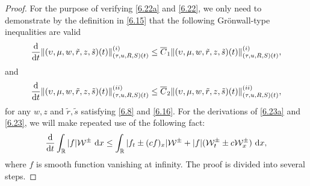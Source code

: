 \documentclass[11pt,reqno]{article}
\newcommand{\fr}{\frac}
\numberwithin{equation}{section}
\begin{document}
\begin{proof}
For the purpose of verifying \eqref{6.22a} and \eqref{6.22}, we only need to demonstrate by the definition in \eqref{6.15} that the following Gr\"onwall-type inequalities are valid
\begin{align}\label{6.23a}
\begin{split}
\fr{\rm d}{{\rm d}t}\|(\upsilon, \mu, w, \tilde{r}, z, \tilde{s})(t)\|_{(\tau, u, R, S)(t)}^{(i)}\leq \overline{C}_1\|(\upsilon, \mu, w, \tilde{r}, z, \tilde{s})(t)\|_{(\tau, u, R, S)(t)}^{(i)},
\end{split}
\end{align}
and
\begin{align}\label{6.23}
\begin{split}
\fr{\rm d}{{\rm d}t}\|(\upsilon, \mu, w, \tilde{r}, z, \tilde{s})(t)\|_{(\tau, u, R, S)(t)}^{(ii)}\leq \overline{C}_2\|(\upsilon, \mu, w, \tilde{r}, z, \tilde{s})(t)\|_{(\tau, u, R, S)(t)}^{(ii)},
\end{split}
\end{align}
for any $w,z$ and $\tilde{r}, \tilde{s}$ satisfying \eqref{6.8} and \eqref{6.16}.
For the derivations of \eqref{6.23a} and \eqref{6.23}, we will make repeated use of the following fact:
\begin{align}\label{6.24}
\begin{split}
\fr{{\rm d}}{{\rm d}t}\int_{\mathbb{R}} |f|\mathcal{W}^\pm\ {\rm d}x\leq \int_{\mathbb{R}} |f_t\pm(cf)_x|\mathcal{W}^\pm + |f|(\mathcal{W}^{\pm}_t\pm c\mathcal{W}^{\pm}_x)\ {\rm d}x,
\end{split}
\end{align}
where $f$ is smooth function vanishing at infinity. The proof is divided into several steps.


\end{proof}
\end{document}
